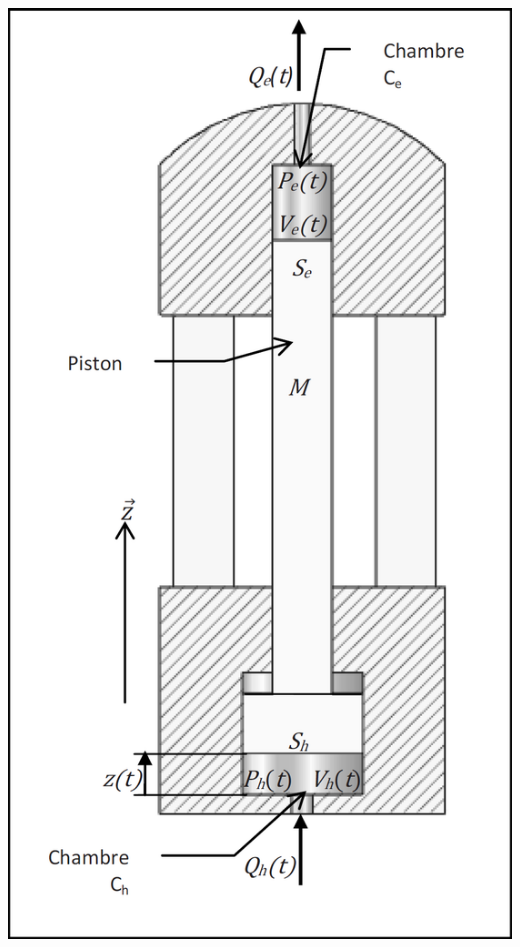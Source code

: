 \documentclass[10pt,fleqn]{article} %
\begin{document}
\begin{multicols}{2}
\begin{center}
\includegraphics[width=.8\linewidth]{images_02/fig_02}
\end{center}



\end{multicols}
\end{document}
